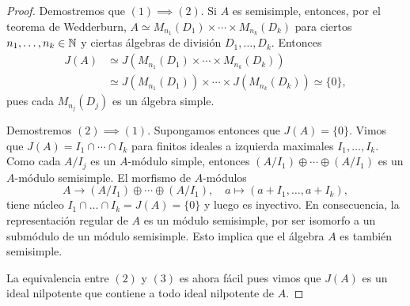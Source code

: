 \begin{proof}
	Demostremos que $(1)\implies(2)$. 
	Si $A$ es semisimple, entonces, por el teorema de Wedderburn, 
	$A\simeq M_{n_1}(D_1)\times\cdots\times M_{n_k}(D_k)$ para ciertos
	$n_1,\dots,n_k\in\mathbb{N}$ y ciertas álgebras de división $D_1,\dots,D_k$. 
	Entonces 
	\begin{align*}
	J(A)&\simeq J(M_{n_1}(D_1)\times\cdots\times M_{n_k}(D_k))\\
	&\simeq J(M_{n_1}(D_1))\times\cdots\times J(M_{n_k}(D_k))\simeq\{0\},
	\end{align*}
	pues cada $M_{n_j}(D_j)$ es un álgebra simple.
	
	Demostremos $(2)\implies(1)$. Supongamos entonces que $J(A)=\{0\}$. 
	Vimos que $J(A)=I_1\cap\cdots\cap I_k$ para
	finitos ideales a izquierda maximales $I_1,\dots,I_k$. 
	Como cada $A/I_j$ es un $A$-módulo 
	simple, entonces $(A/I_1)\oplus\cdots\oplus (A/I_1)$ es un $A$-módulo semisimple. 
	El morfismo de $A$-módulos
	\[
	A\to (A/I_1)\oplus\cdots\oplus (A/I_1),
	\quad
	a\mapsto (a+I_1,\dots,a+I_k),
	\]
	tiene núcleo $I_1\cap\dots\cap I_k=J(A)=\{0\}$ y luego 
	es inyectivo. En consecuencia,  
	la representación regular de $A$ es un módulo 
	semisimple, por ser isomorfo a un submódulo de un módulo semisimple. 
	Esto implica que el álgebra $A$ es también semisimple.  
	
	La equivalencia entre $(2)$ y $(3)$ es ahora fácil pues vimos que $J(A)$ es un ideal nilpotente
	que contiene a todo ideal nilpotente de $A$. 	
%	
\end{proof}

